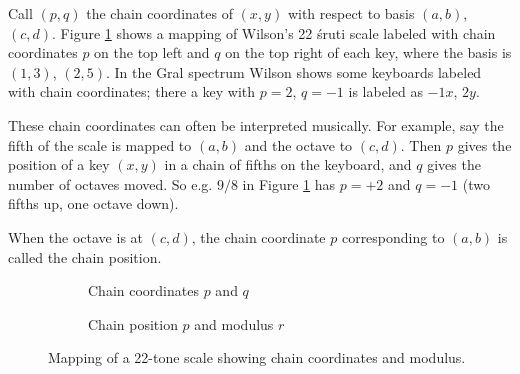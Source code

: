 \documentclass[a4paper,11pt]{article}
\begin{document}
Call $(p, q)$ the chain coordinates of $(x, y)$ with respect to basis $(a, b)$,
$(c, d)$. Figure \ref{fig:indic-pq} shows a mapping of Wilson's 22 \'{s}ruti
scale labeled with chain coordinates $p$ on the top left and $q$ on the top
right of each key, where the basis is $(1, 3)$, $(2, 5)$. In the Gral spectrum
\cite[18-20]{wilsongralspectrum} Wilson shows some keyboards labeled with chain
coordinates; there a key with $p = 2$, $q={-1}$ is labeled as $-1x$, $2y$.

These chain coordinates can often be interpreted musically. For example, say
the fifth of the scale is mapped to $(a, b)$ and the octave to $(c, d)$. Then
$p$ gives the position of a key $(x, y)$ in a chain of fifths on the keyboard,
and $q$ gives the number of octaves moved. So e.g. $9/8$ in Figure
\ref{fig:indic-pq} has $p = +2$ and $q = -1$ (two fifths up, one octave down).

When the octave is at $(c, d)$, the chain coordinate $p$ corresponding to $(a,
b)$ is called the chain position.

\begin{figure}
\begin{subfigure}{\textwidth}

\caption{Chain coordinates $p$ and $q$}
\vspace{0.75cm}
\label{fig:indic-pq}
\end{subfigure}
\begin{subfigure}{\textwidth}

\caption{Chain position $p$ and modulus $r$}
\vspace{0.25cm}
\label{fig:indic-pr}
\end{subfigure}
\caption{Mapping of a 22-tone scale showing chain coordinates and modulus.}
\label{fig:indic}
\end{figure}

\clearpage
\end{document}
